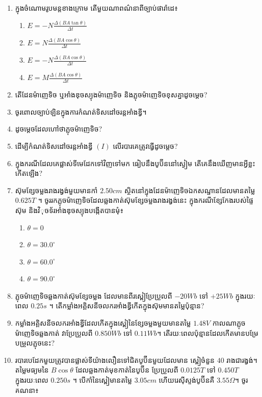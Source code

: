 \documentclass{officialexam}
\begin{document}
	\begin{enumerate}[m]
		\item ក្នុងចំណោមរូបមន្តខាងក្រោម តើមួយណាពណ៌នាពីច្បាប់ផារ៉ាដេ៖
		\begin{enumerate}[k, 2]
			\item $E=-N\frac{\Delta\left(BA\tan\theta\right)}{\Delta t}$
			\item $E=N\frac{\Delta\left(BA\cos\theta\right)}{\Delta t}$
			\item $E=-N\frac{\Delta\left(BA\cos\theta\right)}{\Delta t}$
			\item $E=M\frac{\Delta\left(BA\cos\theta\right)}{\Delta t}$
		\end{enumerate}
		\item តើដែនម៉ាញេទិច ឬអាំងឌុចស្យុងម៉ាញេទិច និងភ្លុចម៉ាញេទិចខុសគ្នាដូចម្តេច?
		\item ចូរពោលច្បាប់ឡិនក្នុងការកំណត់ទិសដៅចរន្តអាំងឌ្វី។
		\item ដូចម្តេចដែលហៅថាភ្លុចម៉ាញេទិច?
		\item ដើម្បីកំណត់ទិសដៅចរន្តអាំងឌ្វី $\left(I\right)$ លើរបារគេត្រូវធ្វើដូចម្តេច?
		\item ក្នុងករណីដែលគេផ្លាស់ទីមេដែកទៅវិញទៅមក ធៀបនឹងបូប៊ីននៅស្ងៀម តើគេនឹងឃើញមានអ្វីខ្លះកើតឡើង?
		\item ស៊ុមខ្សែចម្លងរាងរង្វង់មួយមានកាំ $2.50cm$ ស្ថិតនៅក្នុងដែនម៉ាញេទិចឯកសណ្ឋានដែលមានតម្លៃ $0.625T$ ។ ចូររកភ្លុចម៉ាញេទិចដែលឆ្លងកាត់ស៊ុមខ្សែចម្លងរាងរង្វង់នេះ ក្នុងករណីខ្សែកែងរបស់ផ្ទៃស៊ុម និងវិុចទ័រអាំងឌុចស្យុងបង្កើតបានមុំ៖
		\begin{enumerate}[k,4]
			\item $\theta = 0$
			\item $\theta = 30.0^\circ$
			\item $\theta = 60.0^\circ$
			\item $\theta = 90.0^\circ$
		\end{enumerate}
		\item ភ្លុចម៉ាញេទិចឆ្លងកាត់ស៊ុមខ្សែចម្លង ដែលមានពីរស្ពៀប្រែប្រួលពី $-20Wb$ ទៅ $+25Wb$ ក្នុងរយៈពេល $0.25s$ ។ តើកម្លាំងអគ្គិសនីចលករអាំងឌ្វីកើតក្នុងស៊ុមមានតម្លៃប៉ុន្មាន? 
		\item កម្លាំងអគ្គិសនីចលករអាំងឌ្វីដែលកើតក្នុងស្ពៀនៃខ្សែចម្លងមួយមានតម្លៃ $1.48V$ កាលណាភ្លុចម៉ាញេទិចឆ្លងកាត់ វាប្រែប្រួលពី $0.850Wb$ ទៅ $0.11Wb$។ តើរយៈពេលប៉ុន្មានដែលកើតមានបម្រែបម្រួលភ្លុចនេះ?
		\item របារបេដែកមួយត្រូវបានផ្លាស់ទីយ៉ាងលឿនទៅជិតបូប៊ីនមួយដែលមាន
		ស្ពៀចំនួន $40$ រាងជារង្វង់។ តម្លៃមធ្យមនៃ $B\cos\theta$ ដែលឆ្លងកាត់មុខកាត់នៃបូប៊ីន ប្រែប្រួលពី $0.0125T$ ទៅ $0.450T$ ក្នុងរយៈពេល $0.250s$ ។ បើកាំនៃស្ពៀមានតម្លៃ $3.05cm$ ហើយរេស៊ីស្ទង់បូប៊ីនគឺ $3.55\Omega$។ ចូរគណនា៖

\end{enumerate}
\end{document}
